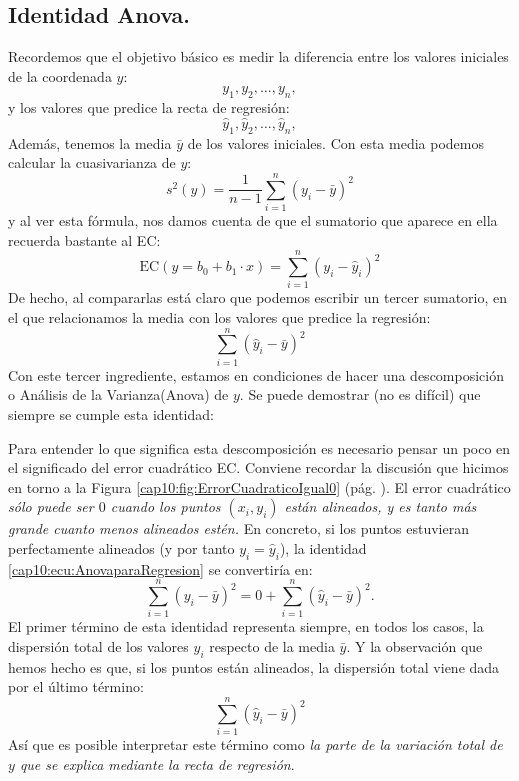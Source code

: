 \subsection{Identidad Anova.}
\label{cap10:subsec:identidadAnova}

Recordemos que el objetivo básico es medir la diferencia entre los valores iniciales de
la coordenada $y$:
\[y_1, y_2,\ldots, y_n,\]
y los valores que predice la recta de regresión:
\[\hat y_1,\hat y_2,\ldots,\hat y_n,\]
Además, tenemos la media $\bar y$ de los valores iniciales. Con esta media podemos calcular
la cuasivarianza de $y$:
\[s^2(y)=\dfrac{1}{n-1}\sum_{i=1}^{n}(y_i-\bar y)^2\]
y al ver esta fórmula, nos damos cuenta de que el sumatorio que aparece en ella recuerda bastante al EC:
\[\mbox{EC}(y=b_0+b_1\cdot x)=\sum_{i=1}^n(y_i-\hat y_i)^2\]
De hecho, al compararlas está claro que podemos escribir un tercer sumatorio, en el que
relacionamos la media con los valores que predice la regresión:
\[\sum_{i=1}^n(\hat y_i-\bar y)^2\]
Con este tercer ingrediente, estamos en condiciones de hacer una descomposición o {\sf Análisis de la
Varianza}(Anova) de $y$. Se puede demostrar (no es
difícil) que siempre se cumple esta identidad:
    \begin{center}
    \end{center}
Para entender lo que significa esta descomposición es necesario pensar un poco en el significado del error cuadrático EC. Conviene recordar la discusión que hicimos en torno a la Figura \ref{cap10:fig:ErrorCuadraticoIgual0} (pág. \pageref{cap10:fig:ErrorCuadraticoIgual0}). El error cuadrático {\em sólo puede ser $0$ cuando los puntos $(x_i,y_i)$ están alineados, y es tanto más grande cuanto menos alineados estén.} En concreto, si los puntos estuvieran perfectamente alineados (y por tanto $y_i=\hat y_i$), la identidad \ref{cap10:ecu:AnovaparaRegresion} se convertiría en:
\[
\displaystyle\sum_{i=1}^{n}(y_i-\bar y)^2 =
    0 + \sum_{i=1}^n(\hat y_i-\bar y)^2.
\]
El primer término de esta identidad representa siempre, en todos los casos, la {\sf dispersión total} de los valores $y_i$ respecto de la media $\bar y$. Y la observación que hemos hecho es que, si los puntos están alineados, la dispersión total viene dada por el último término:
\[\sum_{i=1}^n(\hat y_i-\bar y)^2\]
Así que es posible interpretar este término como {\em la parte de la variación total de $y$ que se explica mediante la recta de regresión}.

